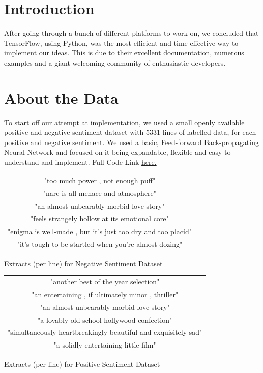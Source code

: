 
\section{Introduction}
After going through a bunch of different platforms to work on, we concluded that TensorFlow, using Python, was the most efficient and time-effective way to implement our ideas. This is due to their excellent documentation, numerous examples and a giant welcoming community of enthusiastic developers.


\section{About the Data}
To start off our attempt at implementation, we used a small openly available positive and negative sentiment dataset with 5331 lines of labelled data, for each positive and negative sentiment. We used a basic, Feed-forward Back-propagating Neural Network and focused on it being expandable, flexible and easy to understand and implement. Full Code Link \href{https://github.com/hsaygan/B.Tech-Project}{here.}


\begin{center}
\begin{tabular}{| c |}
\hline
"too much power , not enough puff"\\
"narc is all menace and atmosphere"\\
"an almost unbearably morbid love story"\\
"feels strangely hollow at its emotional core"\\
"enigma is well-made , but it's just too dry and too placid"\\
"it's tough to be startled when you're almost dozing"\\
\hline
\end{tabular}\newline
\caption{Extracts (per line) for Negative Sentiment Dataset}
\end{center}

\begin{center}
\begin{tabular}{| c |}
\hline
"another best of the year selection"\\
"an entertaining , if ultimately minor , thriller"\\
"an almost unbearably morbid love story"\\
"a lovably old-school hollywood confection"\\
"simultaneously heartbreakingly beautiful and exquisitely sad"\\
"a solidly entertaining little film"\\
\hline
\end{tabular}\newline
\caption{Extracts (per line) for Positive Sentiment Dataset}
\end{center}


